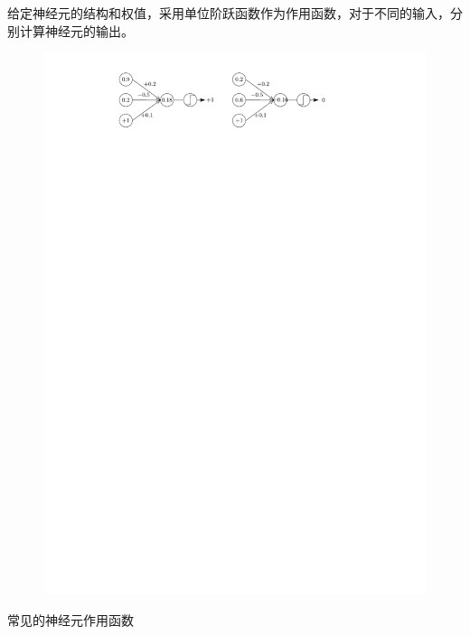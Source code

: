 \begin{example}
    给定神经元的结构和权值，采用单位阶跃函数作为作用函数，对于不同的输入，分别计算神经元的输出。
    \begin{figure}[htbp]
        \centering
        \includegraphics{image/计算MP神经元的输出.pdf}
    \end{figure}
\end{example}
\textcolor{main1}{常见的神经元作用函数}

